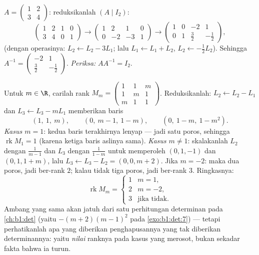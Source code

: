 \begin{example}\label{ex:b1:matrices:inverse}
$A = \begin{pmatrix} 1 & 2 \\ 3 & 4 \end{pmatrix}$: reduksikanlah $(A \mid
I_2)$:
\[
\begin{pmatrix} 1 & 2 & 1 & 0\\ 3 & 4 & 0 & 1 \end{pmatrix}
\to
\begin{pmatrix} 1 & 2 & 1 & 0\\ 0 & -2 & -3 & 1 \end{pmatrix}
\to
\begin{pmatrix} 1 & 0 & -2 & 1\\ 0 & 1 & \tfrac32 & -\tfrac12
\end{pmatrix},
\]
(dengan operasinya: $L_2 \leftarrow L_2 - 3L_1$; lalu $L_1 \leftarrow L_1
+ L_2$, $L_2 \leftarrow -\frac12 L_2$). Sehingga $A^{-1} =
\begin{pmatrix} -2 & 1 \\ \tfrac32 & -\tfrac12\end{pmatrix}$.
\emph{Periksa:} $AA^{-1} = I_2$.
\end{example}

\begin{example}
\label{ex:b1:matrices:rankparameter}
Untuk $m \in \R$, carilah rank
$M_m = \begin{pmatrix} 1 & 1 & m\\ 1 & m & 1\\ m & 1 &
1\end{pmatrix}$. Reduksikanlah: $L_2 \leftarrow L_2 - L_1$ dan $L_3
\leftarrow L_3 - mL_1$ memberikan baris
\[
(1,\ 1,\ m), \qquad (0,\ m - 1,\ 1 - m), \qquad
(0,\ 1 - m,\ 1 - m^2).
\]
\emph{Kasus $m = 1$}: kedua baris terakhirnya lenyap --- jadi satu poros,
sehingga $\operatorname{rk} M_1 = 1$ (karena ketiga baris aslinya
sama). \emph{Kasus $m \neq 1$}: skalakanlah $L_2$ dengan $\frac1{m-1}$ dan
$L_3$ dengan $\frac1{1-m}$ untuk memperoleh $(0, 1, -1)$ dan $(0, 1, 1 + m)$,
lalu $L_3 \leftarrow L_3 - L_2 = (0, 0, m + 2)$. Jika $m = -2$: maka
dua poros, jadi ber-rank $2$; kalau tidak tiga poros, jadi ber-rank $3$. Ringkasnya:
\[
\operatorname{rk} M_m =
\begin{cases}
1 & m = 1,\\
2 & m = -2,\\
3 & \text{jika tidak}.
\end{cases}
\]
Ambang yang sama akan jatuh dari satu perhitungan determinan
pada \cref{ch:b1:det} (yaitu  $-(m+2)(m-1)^2$ pada
\cref{exo:b1:det:7}) --- tetapi perhatikanlah apa yang diberikan penghapusannya yang
tak diberikan determinannya: yaitu \emph{nilai} ranknya pada
kasus yang merosot, bukan sekadar fakta bahwa ia turun.
\end{example}

